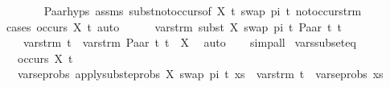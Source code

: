 \begin{isabellebody}
\ \ \ \ \ \ \isamarkupfalse%
\ Paar{\isachardot}{\kern0pt}hyps{\isacharparenleft}{\kern0pt}{}{\isacharparenright}{\kern0pt}\ assms{\isacharparenleft}{\kern0pt}{}{\isacharparenright}{\kern0pt}\ subst{\isacharunderscore}{\kern0pt}not{\isacharunderscore}{\kern0pt}occurs{\isacharbrackleft}{\kern0pt}of\ X\ t{}{}\ {\isacartoucheopen}swap\ pi\ t{}{\isacartoucheclose}{\isacharbrackright}{\kern0pt}\ not{\isacharunderscore}{\kern0pt}occurs{\isacharunderscore}{\kern0pt}trm\isanewline
\ \ \ \ \ \ \isamarkupfalse%
\ {\isacharparenleft}{\kern0pt}cases\ {\isachardoublequoteopen}occurs\ X\ t{}{}{\isachardoublequoteclose}{\isacharparenright}{\kern0pt}\ auto\isanewline
\ \ \ \ \isamarkupfalse%
\ {\isachardoublequoteopen}vars{\isacharunderscore}{\kern0pt}trm\ {\isacharparenleft}{\kern0pt}subst\ {\isacharbrackleft}{\kern0pt}{\isacharparenleft}{\kern0pt}X{\isacharcomma}{\kern0pt}\ swap\ pi\ t{}{\isacharparenright}{\kern0pt}{\isacharbrackright}{\kern0pt}\ {\isacharparenleft}{\kern0pt}Paar\ t{}{}\ t{}{}{\isacharparenright}{\kern0pt}{\isacharparenright}{\kern0pt}\ {\isacharequal}{\kern0pt}\isanewline
\ \ \ \ vars{\isacharunderscore}{\kern0pt}trm\ t{}\ {\isasymunion}\ vars{\isacharunderscore}{\kern0pt}trm\ {\isacharparenleft}{\kern0pt}Paar\ t{}{}\ t{}{}{\isacharparenright}{\kern0pt}\ {\isacharminus}{\kern0pt}\ {\isacharbraceleft}{\kern0pt}X{\isacharbraceright}{\kern0pt}{\isachardoublequoteclose}\ \isamarkupfalse%
\ auto\isanewline
\ \ \isamarkupfalse%
\isanewline
{}\isamarkupfalse%
\ {\isacharparenleft}{\kern0pt}simp{\isacharunderscore}{\kern0pt}all{\isacharparenright}{\kern0pt}%
\endisatagproof
{\isafoldproof}%
%
\isadelimproof
\isanewline
%
\endisadelimproof
\isanewline
\isanewline
{}\isamarkupfalse%
\ vars{\isacharunderscore}{\kern0pt}subseteq{\isacharcolon}{\kern0pt}\isanewline
\ \ \ {\isachardoublequoteopen}{\isasymnot}occurs\ X\ t\ {\isachardoublequoteclose}\isanewline
\ \ \ {\isachardoublequoteopen}vars{\isacharunderscore}{\kern0pt}eprobs\ {\isacharparenleft}{\kern0pt}apply{\isacharunderscore}{\kern0pt}subst{\isacharunderscore}{\kern0pt}eprobs\ {\isacharbrackleft}{\kern0pt}{\isacharparenleft}{\kern0pt}X{\isacharcomma}{\kern0pt}\ swap\ pi\ t{\isacharparenright}{\kern0pt}{\isacharbrackright}{\kern0pt}\ xs{\isacharparenright}{\kern0pt}\ {\isasymsubseteq}\ {\isacharparenleft}{\kern0pt}vars{\isacharunderscore}{\kern0pt}trm\ t\ {\isasymunion}\ vars{\isacharunderscore}{\kern0pt}eprobs\ xs{\isacharparenright}{\kern0pt}{\isachardoublequoteclose}\isanewline

\end{isabellebody}
